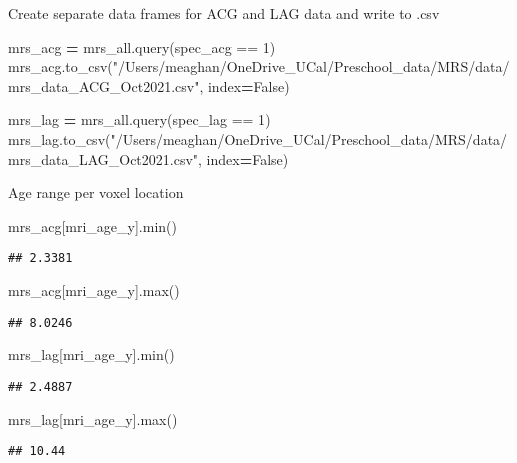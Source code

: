 \documentclass[
]{article}
\newenvironment{Shaded}{\begin{snugshade}}{\end{snugshade}}
\newcommand{\BuiltInTok}[1]{#1}
\newcommand{\NormalTok}[1]{#1}
\newcommand{\OperatorTok}[1]{\textcolor[rgb]{0.81,0.36,0.00}{\textbf{#1}}}
\newcommand{\StringTok}[1]{\textcolor[rgb]{0.31,0.60,0.02}{#1}}
\newcommand{\VariableTok}[1]{\textcolor[rgb]{0.00,0.00,0.00}{#1}}
\begin{document}
Create separate data frames for ACG and LAG data and write to .csv

\begin{Shaded}
\begin{Highlighting}[]
\NormalTok{mrs\_acg }\OperatorTok{=}\NormalTok{ mrs\_all.query(}\StringTok{\textquotesingle{}spec\_acg == 1\textquotesingle{}}\NormalTok{)}
\NormalTok{mrs\_acg.to\_csv(}\StringTok{"/Users/meaghan/OneDrive\_UCal/Preschool\_data/MRS/data/mrs\_data\_ACG\_Oct2021.csv"}\NormalTok{, index}\OperatorTok{=}\VariableTok{False}\NormalTok{)}

\NormalTok{mrs\_lag }\OperatorTok{=}\NormalTok{ mrs\_all.query(}\StringTok{\textquotesingle{}spec\_lag == 1\textquotesingle{}}\NormalTok{)}
\NormalTok{mrs\_lag.to\_csv(}\StringTok{"/Users/meaghan/OneDrive\_UCal/Preschool\_data/MRS/data/mrs\_data\_LAG\_Oct2021.csv"}\NormalTok{, index}\OperatorTok{=}\VariableTok{False}\NormalTok{)}
\end{Highlighting}
\end{Shaded}

Age range per voxel location

\begin{Shaded}
\begin{Highlighting}[]
\NormalTok{mrs\_acg[}\StringTok{\textquotesingle{}mri\_age\_y\textquotesingle{}}\NormalTok{].}\BuiltInTok{min}\NormalTok{()}
\end{Highlighting}
\end{Shaded}

\begin{verbatim}
## 2.3381
\end{verbatim}

\begin{Shaded}
\begin{Highlighting}[]
\NormalTok{mrs\_acg[}\StringTok{\textquotesingle{}mri\_age\_y\textquotesingle{}}\NormalTok{].}\BuiltInTok{max}\NormalTok{()}
\end{Highlighting}
\end{Shaded}

\begin{verbatim}
## 8.0246
\end{verbatim}

\begin{Shaded}
\begin{Highlighting}[]
\NormalTok{mrs\_lag[}\StringTok{\textquotesingle{}mri\_age\_y\textquotesingle{}}\NormalTok{].}\BuiltInTok{min}\NormalTok{()}
\end{Highlighting}
\end{Shaded}

\begin{verbatim}
## 2.4887
\end{verbatim}

\begin{Shaded}
\begin{Highlighting}[]
\NormalTok{mrs\_lag[}\StringTok{\textquotesingle{}mri\_age\_y\textquotesingle{}}\NormalTok{].}\BuiltInTok{max}\NormalTok{()}
\end{Highlighting}
\end{Shaded}

\begin{verbatim}
## 10.44
\end{verbatim}
\end{document}
